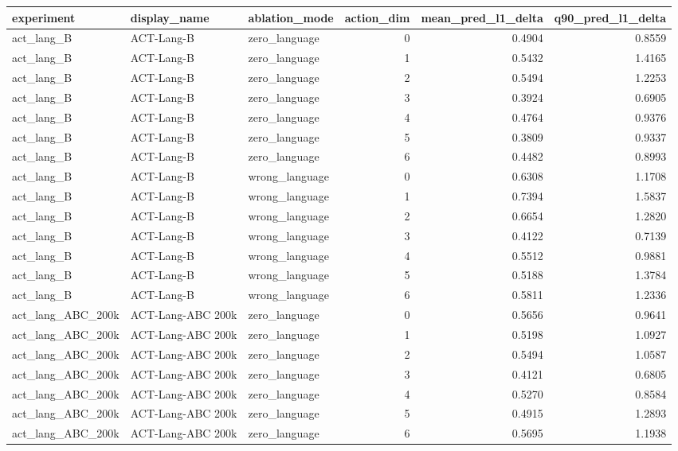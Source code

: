 \begin{tabular}{lllrrr}
\toprule
experiment & display\_name & ablation\_mode & action\_dim & mean\_pred\_l1\_delta & q90\_pred\_l1\_delta \\
\midrule
act\_lang\_B & ACT-Lang-B & zero\_language & 0 & 0.4904 & 0.8559 \\
act\_lang\_B & ACT-Lang-B & zero\_language & 1 & 0.5432 & 1.4165 \\
act\_lang\_B & ACT-Lang-B & zero\_language & 2 & 0.5494 & 1.2253 \\
act\_lang\_B & ACT-Lang-B & zero\_language & 3 & 0.3924 & 0.6905 \\
act\_lang\_B & ACT-Lang-B & zero\_language & 4 & 0.4764 & 0.9376 \\
act\_lang\_B & ACT-Lang-B & zero\_language & 5 & 0.3809 & 0.9337 \\
act\_lang\_B & ACT-Lang-B & zero\_language & 6 & 0.4482 & 0.8993 \\
act\_lang\_B & ACT-Lang-B & wrong\_language & 0 & 0.6308 & 1.1708 \\
act\_lang\_B & ACT-Lang-B & wrong\_language & 1 & 0.7394 & 1.5837 \\
act\_lang\_B & ACT-Lang-B & wrong\_language & 2 & 0.6654 & 1.2820 \\
act\_lang\_B & ACT-Lang-B & wrong\_language & 3 & 0.4122 & 0.7139 \\
act\_lang\_B & ACT-Lang-B & wrong\_language & 4 & 0.5512 & 0.9881 \\
act\_lang\_B & ACT-Lang-B & wrong\_language & 5 & 0.5188 & 1.3784 \\
act\_lang\_B & ACT-Lang-B & wrong\_language & 6 & 0.5811 & 1.2336 \\
act\_lang\_ABC\_200k & ACT-Lang-ABC 200k & zero\_language & 0 & 0.5656 & 0.9641 \\
act\_lang\_ABC\_200k & ACT-Lang-ABC 200k & zero\_language & 1 & 0.5198 & 1.0927 \\
act\_lang\_ABC\_200k & ACT-Lang-ABC 200k & zero\_language & 2 & 0.5494 & 1.0587 \\
act\_lang\_ABC\_200k & ACT-Lang-ABC 200k & zero\_language & 3 & 0.4121 & 0.6805 \\
act\_lang\_ABC\_200k & ACT-Lang-ABC 200k & zero\_language & 4 & 0.5270 & 0.8584 \\
act\_lang\_ABC\_200k & ACT-Lang-ABC 200k & zero\_language & 5 & 0.4915 & 1.2893 \\
act\_lang\_ABC\_200k & ACT-Lang-ABC 200k & zero\_language & 6 & 0.5695 & 1.1938 \\

\end{tabular}
